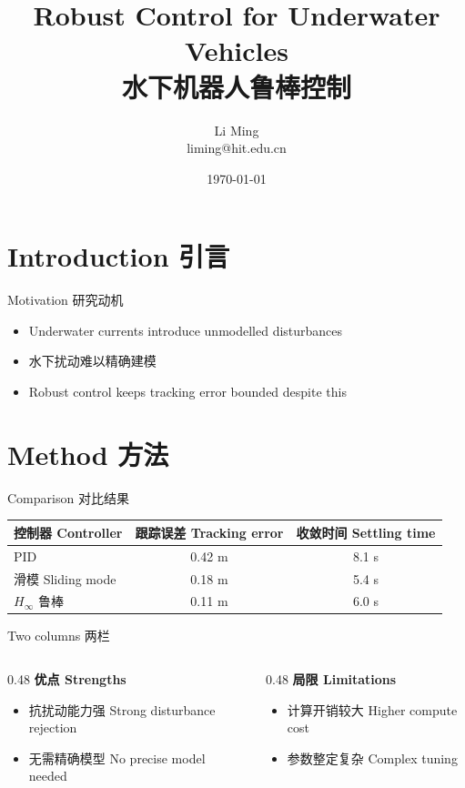 \documentclass[compress]{beamer}
\title[Underwater Control]{Robust Control for Underwater Vehicles\\[2mm] 水下机器人鲁棒控制}
\author[Li Ming]{Li Ming\\[3mm] {\small liming@hit.edu.cn}}
\institute[HITSZ]{\small School of Mechanical Engineering \\
  哈尔滨工业大学（深圳）机电工程学院}
\date{\today}
\begin{document}
\begin{frame}
  \titlepage
\end{frame}

\begin{frame}
\tableofcontents
\end{frame}

\section{Introduction 引言}

\begin{frame}{Motivation 研究动机}
  \begin{itemize}
    \item Underwater currents introduce unmodelled disturbances
    \item 水下扰动难以精确建模
    \item Robust control keeps tracking error bounded despite this
  \end{itemize}
\end{frame}

\section{Method 方法}

\begin{frame}{Comparison 对比结果}
  \begin{table}
    \centering
    \begin{tabular}{lcc}
      \toprule
      控制器 Controller & 跟踪误差 Tracking error & 收敛时间 Settling time \\
      \midrule
      PID & 0.42 m & 8.1 s \\
      滑模 Sliding mode & 0.18 m & 5.4 s \\
      $H_\infty$ 鲁棒 & 0.11 m & 6.0 s \\
      \bottomrule
    \end{tabular}
  \end{table}
\end{frame}

\begin{frame}{Two columns 两栏}
  \begin{columns}
    \begin{column}{0.48\textwidth}
      \textbf{优点 Strengths}
      \begin{itemize}
        \item 抗扰动能力强 Strong disturbance rejection
        \item 无需精确模型 No precise model needed
      \end{itemize}
    \end{column}
    \begin{column}{0.48\textwidth}
      \textbf{局限 Limitations}
      \begin{itemize}
        \item 计算开销较大 Higher compute cost
        \item 参数整定复杂 Complex tuning
      \end{itemize}
    \end{column}
  \end{columns}
\end{frame}
\end{document}
